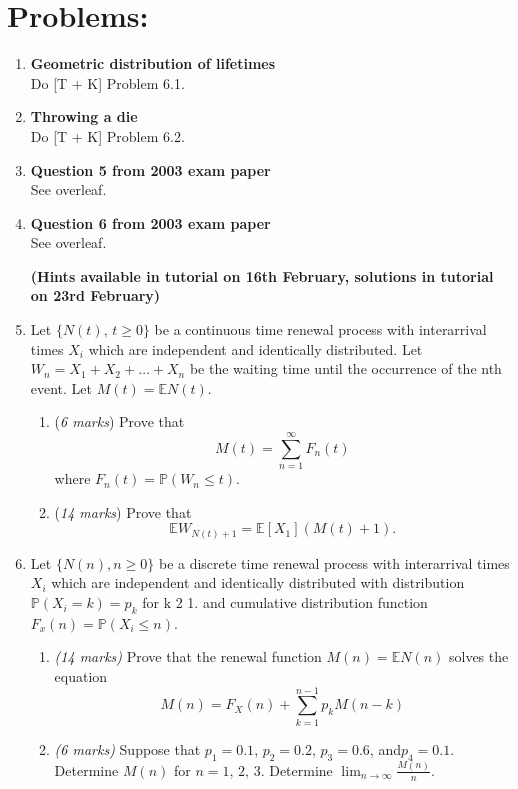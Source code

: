 \documentclass[11pt,a4paper]{article}
\begin{document}
  \section*{Problems:}
  \begin{enumerate}
    \item \textbf{Geometric distribution of lifetimes}\\
    Do [T + K] Problem 6.1.
    \item \textbf{Throwing a die}\\
    Do [T + K] Problem 6.2.
    \item \textbf{Question 5 from 2003 exam paper}\\
    See overleaf.
    \item \textbf{Question 6 from 2003 exam paper}\\
    See overleaf.\par 
    \textbf{(Hints available in tutorial on 16th February, solutions in tutorial on 23rd February)}
    \item Let $\{N(t),\, t \geq 0\}$ be a continuous time renewal process with interarrival times $X_i$ which are independent and identically distributed. Let $W_n = X_1 + X_2 +\ldots + X_n$ be the waiting time until the occurrence of the nth event. Let $M(t) = \mathbb{E}N(t)$.
    \begin{enumerate}
      \item (\textit{6 marks}) Prove that
      $$
      M(t) = \sum_{n = 1}^\infty F_n(t)
      $$
      where $F_n(t) = \mathbb{P}(W_n \leq t)$.
      \item (\textit{14 marks}) Prove that
      $$
      \mathbb{E}W_{N(t) + 1} = \mathbb{E}[X_1](M(t) + 1).
      $$ 
    \end{enumerate}
    \item Let $\{N(n), n\geq 0\}$ be a discrete time renewal process with interarrival times $X_i$ which are independent and identically distributed with distribution $\mathbb{P}(X_i = k) = p_k$ for k 2 1. and cumulative distribution function $F_x(n) = \mathbb{P}(X_i \leq n)$.
    \begin{enumerate}
      \item \textit{(14 marks)} Prove that the renewal function $M(n) = \mathbb{E}N(n)$ solves the equation
      $$
      M(n) = F_X(n) + \sum_{k = 1}^{n - 1}p_kM(n - k)
      $$
      \item \textit{(6 marks)} Suppose that $p_1 = 0.1,\, p_2 = 0.2,\, p_3 = 0.6$, and$p_4 = 0.1$. Determine $M(n)$ for $n = 1,\, 2,\, 3$. Determine $\lim_{n\to\infty} \frac{M(n)}{n}$.
    \end{enumerate}
  \end{enumerate}
  \newpage
\end{document}
